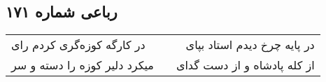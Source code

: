 \begin{center}
\section*{رباعی شماره ۱۷۱}
\label{sec:sh171}
\begin{longtable}{l p{0.5cm} r}
در کارگه کوزه‌گری کردم رای
&&
در پایه چرخ دیدم استاد بپای
\\
میکرد دلیر کوزه را دسته و سر
&&
از کله پادشاه و از دست گدای
\\
\end{longtable}
\end{center}
